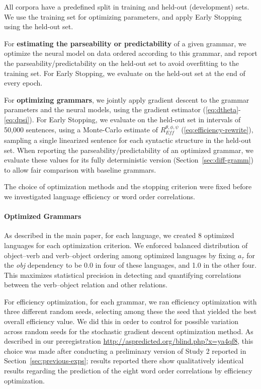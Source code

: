 \documentclass[10pt,twoside,lineno]{article}
\newcommand{\key}[1]{\textbf{#1}}
\begin{document}
All corpora have a predefined split in training and held-out (development) sets.
We use the training set for optimizing parameters, and apply Early Stopping~\citep{prechelt1998early} using the held-out set.

For \key{estimating the parseability or predictability} of a given grammar, we optimize the neural model on data ordered according to this grammar, and report the parseability/predictability on the held-out set to avoid overfitting to the training set.
For Early Stopping, we evaluate on the held-out set at the end of every epoch. %

For \key{optimizing grammars}, we jointly apply gradient descent to the grammar parameters and the neural models, using the gradient estimator (\ref{eq:dtheta}-\ref{eq:dpsi}).
For Early Stopping, we evaluate on the held-out set in intervals of 50,000 sentences, using a Monte-Carlo estimate of $R_{\textit{Eff}}^{\theta, \phi, \psi}$ (\ref{eq:efficiency-rewrite}), sampling a single linearized sentence for each syntactic structure in the held-out set.
When reporting the parseability/predictability of an optimized grammar, we evaluate these values for its fully deterministic version (Section~\ref{sec:diff-gramm}) to allow fair comparison with baseline grammars.


The choice of optimization methods and the stopping criterion were fixed before we investigated language efficiency or word order correlations.

\paragraph{Optimized Grammars}
As described in the main paper, for each language, we created 8 optimized languages for each optimization criterion.
We enforced balanced distribution of object--verb and verb--object ordering among optimized languages by fixing $a_\tau$ for the \textit{obj} dependency to be 0.0 in four of these languages, and 1.0 in the other four.
This maximizes statistical precision in detecting and quantifying correlations between the verb--object relation and other relations.

For efficiency optimization, for each grammar, we ran efficiency optimization with three different random seeds, selecting among these the seed that yielded the best overall efficiency value.
We did this in order to control for possible variation across random seeds for the stochastic gradient descent optimization method.
As described in our preregistration \url{http://aspredicted.org/blind.php?x=ya4qf8}, this choice was made after conducting a preliminary version of Study 2 reported in Section~\ref{sec:previous-exps}; results reported there show qualitatively identical results regarding the prediction of the eight word order correlations by efficiency optimization.
\end{document}
